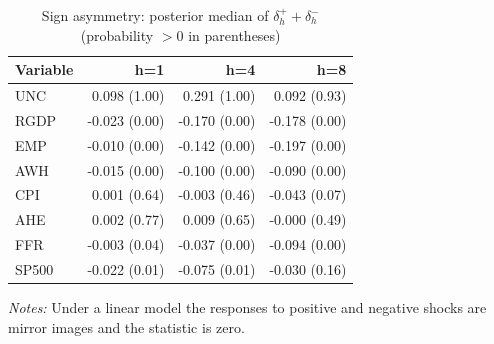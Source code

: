 \begin{table}[htbp]
\centering
\caption{Sign asymmetry: posterior median of $\delta^{+}_h + \delta^{-}_h$ (probability $>0$ in parentheses)}
\label{tab:sign}
\begin{tabular}{lrrr}
\toprule
Variable & h=1 & h=4 & h=8 \\
\midrule
UNC & 0.098 (1.00) & 0.291 (1.00) & 0.092 (0.93) \\
RGDP & -0.023 (0.00) & -0.170 (0.00) & -0.178 (0.00) \\
EMP & -0.010 (0.00) & -0.142 (0.00) & -0.197 (0.00) \\
AWH & -0.015 (0.00) & -0.100 (0.00) & -0.090 (0.00) \\
CPI & 0.001 (0.64) & -0.003 (0.46) & -0.043 (0.07) \\
AHE & 0.002 (0.77) & 0.009 (0.65) & -0.000 (0.49) \\
FFR & -0.003 (0.04) & -0.037 (0.00) & -0.094 (0.00) \\
SP500 & -0.022 (0.01) & -0.075 (0.01) & -0.030 (0.16) \\
\bottomrule
\end{tabular}
\begin{minipage}{0.95\linewidth}\footnotesize\emph{Notes:} Under a linear model the responses to positive and negative shocks are mirror images and the statistic is zero.\end{minipage}
\end{table}
